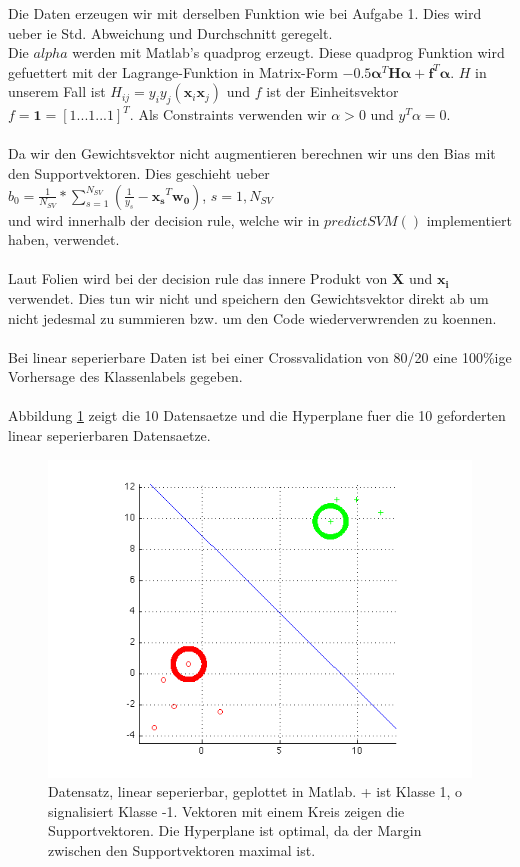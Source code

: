 \documentclass[12pt]{article}
\begin{document}
Die Daten erzeugen wir mit derselben Funktion wie bei Aufgabe 1. Dies wird ueber ie Std. Abweichung und Durchschnitt geregelt.
\\
Die $alpha$ werden mit Matlab's quadprog erzeugt. Diese quadprog Funktion wird gefuettert mit der Lagrange-Funktion in Matrix-Form $-0.5 \boldsymbol{\alpha}^T\mathbf{H}\boldsymbol{\alpha} + \mathbf{f}^T\boldsymbol{\alpha}$. $H$ in unserem Fall ist $H_{ij} = y_iy_j(\mathbf{x}_i\mathbf{x}_j)$ und $f$ ist der Einheitsvektor $f = \mathbf{1} = [1 ... 1 ... 1]^T$. Als Constraints verwenden wir $\alpha > 0$ und $y^T\alpha = 0$.
\\
\\
Da wir den Gewichtsvektor nicht augmentieren berechnen wir uns den Bias mit den Supportvektoren. Dies geschieht ueber 
\\
$\displaystyle b_0 = \frac{1}{N_{SV}} *  \sum_{s=1}^{N_{SV}} (\frac{1}{y_s} - \mathbf{x_s}^T\mathbf{w_0}) $, $s = 1, N_{SV}$
\\
und wird innerhalb der decision rule, welche wir in $predictSVM()$ implementiert haben, verwendet.
\\
\\
Laut Folien wird bei der decision rule das innere Produkt von $\mathbf{X}$ und $\mathbf{x_i}$ verwendet. Dies tun wir nicht und speichern den Gewichtsvektor direkt ab um nicht jedesmal zu summieren bzw. um den Code wiederverwrenden zu koennen.
\\
\\
Bei linear seperierbare Daten ist bei einer Crossvalidation von 80/20 eine 100\%ige Vorhersage des Klassenlabels gegeben.
\\
\\
Abbildung \ref{fig:lin} zeigt die 10 Datensaetze und die Hyperplane fuer die 10 geforderten linear seperierbaren Datensaetze.
\\
\begin{figure}[htp]
	\centering
	\includegraphics[width=1\textwidth]{linear_sep_data_plot}
	\caption{Datensatz, linear seperierbar, geplottet in Matlab. + ist Klasse 1, o signalisiert Klasse -1. Vektoren mit einem Kreis zeigen die Supportvektoren. Die Hyperplane ist optimal, da der Margin zwischen den Supportvektoren maximal ist.}
	\label{fig:lin}
\end{figure}
\end{document}
